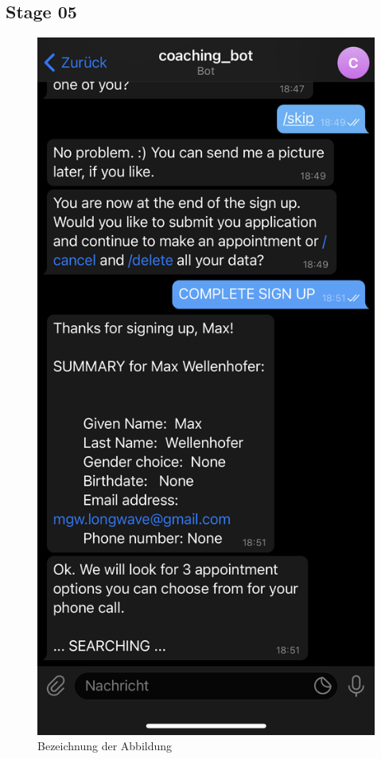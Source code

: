 \subsection{Stage 05}
\begin{figure} %
	\centering
	\includegraphics{images/coaching_bot_dummy_screenshot.jpeg}
	\caption{Bezeichnung der Abbildung}
	\label{a6}
\end{figure}


